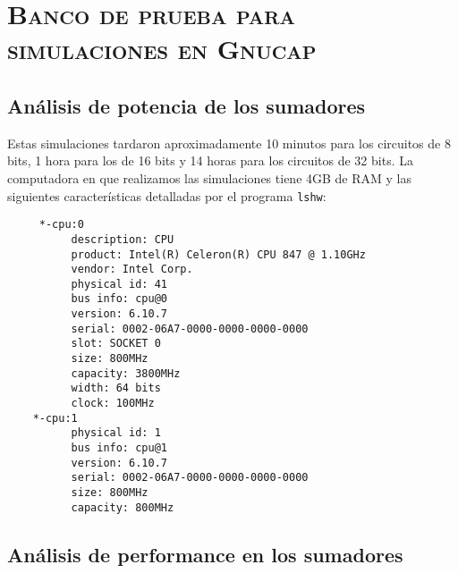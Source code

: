 \chapter{\textsc{ Banco de prueba para simulaciones en Gnucap}}\label{chap:gnucap_testbench}
\section{Análisis de potencia de los sumadores}
Estas simulaciones tardaron aproximadamente 10 minutos para los circuitos de 8 bits, 1 hora para los de 16 bits y 14 horas para los circuitos de 32 bits. La computadora en que realizamos las simulaciones tiene 4GB de RAM y las siguientes características detalladas  por el programa \verb.lshw.:
\begin{verbatim}
     *-cpu:0
          description: CPU
          product: Intel(R) Celeron(R) CPU 847 @ 1.10GHz
          vendor: Intel Corp.
          physical id: 41
          bus info: cpu@0
          version: 6.10.7
          serial: 0002-06A7-0000-0000-0000-0000
          slot: SOCKET 0
          size: 800MHz
          capacity: 3800MHz
          width: 64 bits
          clock: 100MHz
    *-cpu:1
          physical id: 1
          bus info: cpu@1
          version: 6.10.7
          serial: 0002-06A7-0000-0000-0000-0000
          size: 800MHz
          capacity: 800MHz
\end{verbatim}


\section{Análisis de performance en los sumadores}

